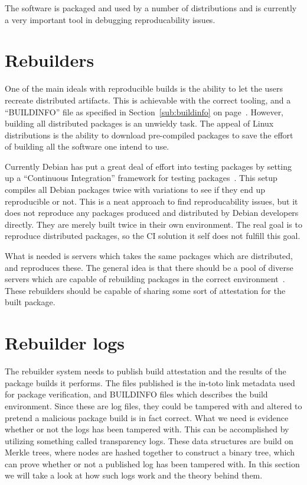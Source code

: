 \documentclass[../Main/thesis.tex]{subfiles}
\begin{document}
The software is packaged and used by a number of distributions and is currently
a very important tool in debugging reproducability issues.


\section{Rebuilders}%
\label{sec:rebuilders} 
One of the main ideals with reproducible builds is the ability to let the users
recreate distributed artifacts. This is achievable with the correct tooling, and
a ``BUILDINFO'' file as specified in Section~\ref{sub:buildinfo} on
page~\pageref{sub:buildinfo}. However, building all distributed packages is an
unwieldy task. The appeal of Linux distributions is the ability to download
pre-compiled packages to save the effort of building all the software one intend
to use.

Currently Debian has put a great deal of effort into testing packages by setting
up a ``Continuous Integration'' framework for testing packages~\cite{debian-ci}.
This setup compiles all Debian packages twice with variations to see if they end
up reproducible or not. This is a neat approach to find reproducability issues,
but it does not reproduce any packages produced and distributed by Debian
developers directly. They are merely built twice in their own environment. The
real goal is to reproduce distributed packages, so the CI solution it self does
not fulfill this goal.

What is needed is servers which takes the same packages which are distributed,
and reproduces these. The general idea is that there should be a pool of diverse
servers which are capable of rebuilding packages in the correct
environment~\cite{reproducible-builds-sharing}. These rebuilders should be
capable of sharing some sort of attestation for the built package.

\section{Rebuilder logs}%
\label{sec:rebuilder_logs}
The rebuilder system needs to publish build attestation and the results of the
package builds it performs. The files published is the in-toto link metadata
used for package verification, and BUILDINFO files which describes the build
environment. Since these are log files, they could be tampered with and altered
to pretend a malicious package build is in fact correct. What we need is
evidence whether or not the logs has been tampered with. This can be
accomplished by utilizing something called transparency logs. These data
structures are build on Merkle trees, where nodes are hashed together to
construct a binary tree, which can prove whether or not a published log has been
tampered with. In this section we will take a look at how such logs work and the
theory behind them.
\end{document}
